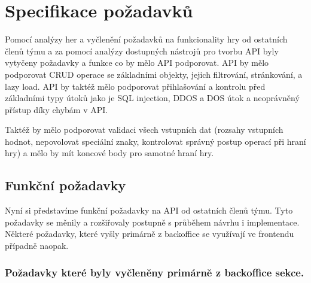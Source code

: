 \section{Specifikace požadavků}
Pomocí analýzy her a vyčlenění požadavků na funkcionality hry od ostatních členů týmu a za pomocí analýzy dostupných nástrojů pro tvorbu API byly vytyčeny požadavky a funkce co by mělo API podporovat. API by mělo podporovat CRUD operace se základními objekty, jejich filtrování, stránkování, a lazy load. API by taktéž mělo podporovat přihlašování a kontrolu před základními typy útoků jako je SQL injection, DDOS a DOS útok a neoprávněný přístup díky chybám v API.

Taktéž by mělo podporovat validaci všech vstupních dat (rozsahy vstupních hodnot, nepovolovat speciální znaky, kontrolovat správný postup operací při hraní hry) a mělo by mít koncové body pro samotné hraní hry.

\subsection{Funkční požadavky}
Nyní si představíme funkční požadavky na API od ostatních členů týmu. Tyto požadavky se měnily a rozšiřovaly postupně s průběhem návrhu i implementace. Některé požadavky, které vyšly primárně z backoffice se využívají ve frontendu případně naopak.

\subsubsection*{Požadavky které byly vyčleněny primárně z backoffice sekce.}


